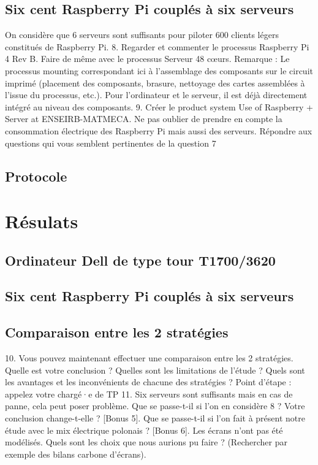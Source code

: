 \documentclass[12pt,a4paper]{article}
\begin{document}
\subsection{Six cent Raspberry Pi couplés à six serveurs}
On considère que 6 serveurs sont suffisants pour piloter 600 clients légers constitués de Raspberry
Pi.
8. Regarder et commenter le processus Raspberry Pi 4 Rev B. Faire de même avec le processus
Serveur 48 cœurs. Remarque : Le processus mounting correspondant ici à l’assemblage des
composants sur le circuit imprimé (placement des composants, brasure, nettoyage des cartes
assemblées à l’issue du processus, etc.). Pour l’ordinateur et le serveur, il est déjà directement
intégré au niveau des composants.
9. Créer le product system Use of Raspberry + Server at ENSEIRB-MATMECA. Ne pas oublier
de prendre en compte la consommation électrique des Raspberry Pi mais aussi des serveurs.
Répondre aux questions qui vous semblent pertinentes de la question 7


\subsection{Protocole}
\noindent \lipsum[1-2]


\section{Résulats}
\subsection{Ordinateur Dell de type tour T1700/3620}
\noindent \lipsum[1-2]

\subsection{Six cent Raspberry Pi couplés à six serveurs}
\noindent \lipsum[1-2]

\subsection{Comparaison entre les 2 stratégies}
10. Vous pouvez maintenant effectuer une comparaison entre les 2 stratégies. Quelle est votre
conclusion ? Quelles sont les limitations de l’étude ? Quels sont les avantages et les inconvénients
de chacune des stratégies ?
Point d’étape : appelez votre chargé·e de TP
11. Six serveurs sont suffisants mais en cas de panne, cela peut poser problème. Que se passe-t-il
si l’on en considère 8 ? Votre conclusion change-t-elle ?
[Bonus 5]. Que se passe-t-il si l’on fait à présent notre étude avec le mix électrique polonais ?
[Bonus 6]. Les écrans n’ont pas été modélisés. Quels sont les choix que nous aurions pu faire ?
(Rechercher par exemple des bilans carbone d’écrans).
\end{document}
